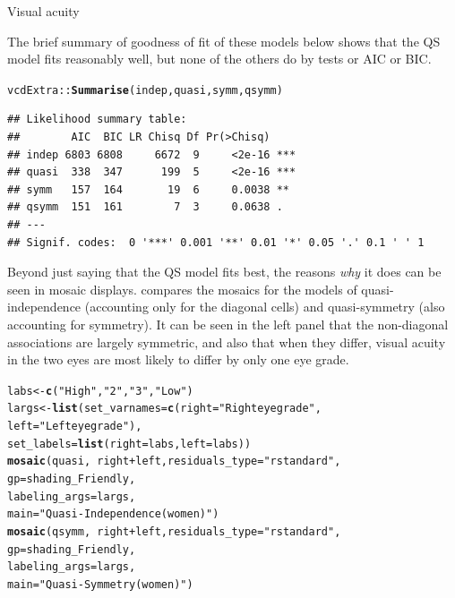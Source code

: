 \documentclass[11pt]{book}\usepackage[]{graphicx}\usepackage[]{color}
\makeatletter
\newcommand{\hlstr}[1]{\textcolor[rgb]{0.192,0.494,0.8}{#1}}%
\newcommand{\hlopt}[1]{\textcolor[rgb]{0,0,0}{#1}}%
\newcommand{\hlstd}[1]{\textcolor[rgb]{0.345,0.345,0.345}{#1}}%
\newcommand{\hlkwb}[1]{\textcolor[rgb]{0.69,0.353,0.396}{#1}}%
\newcommand{\hlkwc}[1]{\textcolor[rgb]{0.333,0.667,0.333}{#1}}%
\newcommand{\hlkwd}[1]{\textcolor[rgb]{0.737,0.353,0.396}{\textbf{#1}}}%
\newenvironment{kframe}{%
 \def\at@end@of@kframe{}%
 \ifinner\ifhmode%
  \def\at@end@of@kframe{\end{minipage}}%
  \begin{minipage}{\columnwidth}%
 \fi\fi%
 \def\FrameCommand##1{\hskip\@totalleftmargin \hskip-\fboxsep
 \colorbox{shadecolor}{##1}\hskip-\fboxsep
     \hskip-\linewidth \hskip-\@totalleftmargin \hskip\columnwidth}%
 \MakeFramed {\advance\hsize-\width
   \@totalleftmargin\z@ \linewidth\hsize
   \@setminipage}}%
 {\par\unskip\endMakeFramed%
 \at@end@of@kframe}
\newenvironment{knitrout}{}{} %
\renewenvironment{knitrout}{\small\renewcommand{\baselinestretch}{.85}}{} %
\makeatother
\begin{document}
\begin{Example}{Visual acuity}
\begin{knitrout}
\begin{kframe}
\end{kframe}
\end{knitrout}
The brief summary of goodness of fit of these models below shows that
the QS model fits reasonably well, but none of the others do by
\LR tests or AIC or BIC.
\begin{knitrout}
\color{fgcolor}\begin{kframe}
\begin{alltt}
\hlstd{vcdExtra::}\hlkwd{Summarise}\hlstd{(indep, quasi, symm, qsymm)}
\end{alltt}
\begin{verbatim}
## Likelihood summary table:
##        AIC  BIC LR Chisq Df Pr(>Chisq)    
## indep 6803 6808     6672  9     <2e-16 ***
## quasi  338  347      199  5     <2e-16 ***
## symm   157  164       19  6     0.0038 ** 
## qsymm  151  161        7  3     0.0638 .  
## ---
## Signif. codes:  0 '***' 0.001 '**' 0.01 '*' 0.05 '.' 0.1 ' ' 1
\end{verbatim}
\end{kframe}
\end{knitrout}
Beyond just saying that the QS model fits best, the reasons \emph{why} it does
can be seen in mosaic displays.   compares the
mosaics for the models of quasi-independence
(accounting only for the diagonal cells)
and quasi-symmetry (also accounting for symmetry).  It can be seen in the left
panel that the non-diagonal associations are largely symmetric, and also that
when they differ, visual acuity in the two eyes are most likely to differ by
only one eye grade.

\begin{knitrout}
\color{fgcolor}\begin{kframe}
\begin{alltt}
\hlstd{labs} \hlkwb{<-} \hlkwd{c}\hlstd{(}\hlstr{"High"}\hlstd{,} \hlstr{"2"}\hlstd{,} \hlstr{"3"}\hlstd{,} \hlstr{"Low"}\hlstd{)}
\hlstd{largs} \hlkwb{<-} \hlkwd{list}\hlstd{(}\hlkwc{set_varnames} \hlstd{=} \hlkwd{c}\hlstd{(}\hlkwc{right}\hlstd{=}\hlstr{"Right eye grade"}\hlstd{,}
                               \hlkwc{left}\hlstd{=}\hlstr{"Left eye grade"}\hlstd{),}
              \hlkwc{set_labels}\hlstd{=}\hlkwd{list}\hlstd{(}\hlkwc{right}\hlstd{=labs,} \hlkwc{left}\hlstd{=labs))}
\hlkwd{mosaic}\hlstd{(quasi,} \hlopt{~}\hlstd{right} \hlopt{+} \hlstd{left,} \hlkwc{residuals_type}\hlstd{=}\hlstr{"rstandard"}\hlstd{,}
       \hlkwc{gp}\hlstd{=shading_Friendly,}
       \hlkwc{labeling_args}\hlstd{=largs,}
       \hlkwc{main}\hlstd{=}\hlstr{"Quasi-Independence (women)"}\hlstd{)}
\hlkwd{mosaic}\hlstd{(qsymm,} \hlopt{~}\hlstd{right} \hlopt{+} \hlstd{left,} \hlkwc{residuals_type}\hlstd{=}\hlstr{"rstandard"}\hlstd{,}
       \hlkwc{gp}\hlstd{=shading_Friendly,}
       \hlkwc{labeling_args}\hlstd{=largs,}
       \hlkwc{main}\hlstd{=}\hlstr{"Quasi-Symmetry (women)"}\hlstd{)}
\end{alltt}
\end{kframe}\begin{figure}[!htbp]



\end{figure}
\end{knitrout}
\end{Example}
\end{document}
